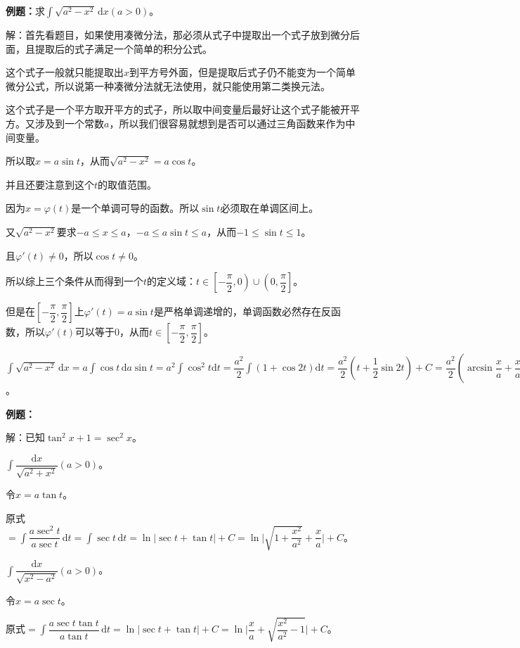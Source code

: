 \documentclass[UTF8, 12pt]{ctexart}
\begin{document}
\textbf{例题：}求$\int\sqrt{a^2-x^2}\,\textrm{d}x(a>0)$。

解：首先看题目，如果使用凑微分法，那必须从式子中提取出一个式子放到微分后面，且提取后的式子满足一个简单的积分公式。

这个式子一般就只能提取出$x$到平方号外面，但是提取后式子仍不能变为一个简单微分公式，所以说第一种凑微分法就无法使用，就只能使用第二类换元法。

这个式子是一个平方取开平方的式子，所以取中间变量后最好让这个式子能被开平方。又涉及到一个常数$a$，所以我们很容易就想到是否可以通过三角函数来作为中间变量。

所以取$x=a\sin t$，从而$\sqrt{a^2-x^2}=a\cos t$。

并且还要注意到这个$t$的取值范围。

因为$x=\varphi(t)$是一个单调可导的函数。所以$\sin t$必须取在单调区间上。

又$\sqrt{a^2-x^2}$要求$-a\leqslant x\leqslant a$，$-a\leqslant a\sin t\leqslant a$，从而$-1\leqslant\sin t\leqslant 1$。

且$\varphi'(t)\neq 0$，所以$\cos t\neq 0$。

所以综上三个条件从而得到一个$t$的定义域：$t\in\left[-\dfrac{\pi}{2},0\right)\cup\left(0,\dfrac{\pi}{2}\right]$。

但是在$\left[-\dfrac{\pi}{2},\dfrac{\pi}{2}\right]$上$\varphi'(t)=a\sin t$是严格单调递增的，单调函数必然存在反函数，所以$\varphi'(t)$可以等于0，从而$t\in\left[-\dfrac{\pi}{2},\dfrac{\pi}{2}\right]$。

$\int\sqrt{a^2-x^2}\,\textrm{d}x=a\int\cos t\,\textrm{d}a\sin t=a^2\int\cos^2t\textrm{d}t=\dfrac{a^2}{2}\int(1+\cos 2t)\textrm{d}t=\dfrac{a^2}{2}\left(t+\dfrac{1}{2}\sin 2t\right)+C=\dfrac{a^2}{2}\left(\arcsin\dfrac{x}{a}+\dfrac{x}{a}\sqrt{1-\dfrac{x^2}{a^2}}\right)+C$。

\textbf{例题：}

解：已知$\tan^2x+1=\sec^2x$。

$\displaystyle{\int\dfrac{\textrm{d}x}{\sqrt{a^2+x^2}}}(a>0)$。

令$x=a\tan t$。

原式$=\displaystyle{\int\dfrac{a\sec^2t}{a\sec t}\,\textrm{d}t=\int\sec t\,\textrm{d}t}=\ln\vert\sec t+\tan t\vert+C=\ln\bigg\vert\sqrt{1+\dfrac{x^2}{a^2}}+\dfrac{x}{a}\bigg\vert+C$。

$\displaystyle{\int\dfrac{\textrm{d}x}{\sqrt{x^2-a^2}}}(a>0)$。

令$x=a\sec t$。

原式$=\displaystyle{\int\dfrac{a\sec t\tan t}{a\tan t}\,\textrm{d}t}=\ln\bigg\vert\sec t+\tan t\bigg\vert+C=\ln\bigg\vert\dfrac{x}{a}+\sqrt{\dfrac{x^2}{a^2}-1}\vert+C$。\medskip
\end{document}
